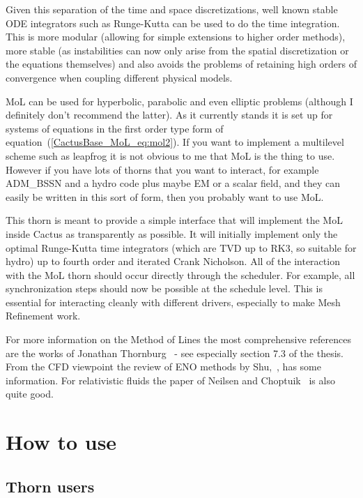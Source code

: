 Given this separation of the time and space discretizations, well
known stable ODE integrators such as Runge-Kutta can be used to do the
time integration. This is more modular (allowing for simple extensions
to higher order methods), more stable (as instabilities can now only
arise from the spatial discretization or the equations themselves) and
also avoids the problems of retaining high orders of convergence when
coupling different physical models.

MoL can be used for hyperbolic, parabolic and even elliptic problems
(although I definitely don't recommend the latter). As it currently
stands it is set up for systems of equations in the first order type
form of equation~(\ref{CactusBase_MoL_eq:mol2}). If you want to implement a
multilevel scheme such as leapfrog it is not obvious to me that MoL is
the thing to use. However if you have lots of thorns that you want to
interact, for example ADM\_BSSN and a hydro code plus maybe EM or a
scalar field, and they can easily be written in this sort of form,
then you probably want to use MoL.

This thorn is meant to provide a simple interface that will implement
the MoL inside Cactus as transparently as possible. It will initially
implement only the optimal Runge-Kutta time integrators (which are TVD
up to RK3, so suitable for hydro) up to fourth order and iterated
Crank Nicholson. All of the interaction with the MoL thorn should
occur directly through the scheduler. For example, all synchronization
steps should now be possible at the schedule level. This is essential
for interacting cleanly with different drivers, especially to make
Mesh Refinement work.

For more information on the Method of Lines the most comprehensive
references are the works of Jonathan
Thornburg~\cite{CactusBase_MoL_Thornburg93,CactusBase_MoL_Thornburg99}
- see especially section 7.3 of the thesis. From the CFD viewpoint the
review of ENO methods by Shu,~\cite{CactusBase_MoL_Shu99}, has some
information. For relativistic fluids the paper of Neilsen and
Choptuik~\cite{CactusBase_MoL_Neilsen00} is also quite good.

\section{How to use}
\label{CactusBase_MoL_sec:use}


\subsection{Thorn users}
\label{CactusBase_MoL_sec:useruse}

